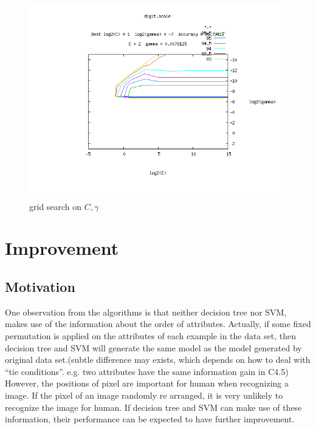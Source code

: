 \documentclass[a4paper,11pt]{article}
\begin{document}
\begin{figure}
\centering
\includegraphics[width=1.0\textwidth]{digit}
\caption{grid search on $C,\gamma$}
\end{figure}

\section{Improvement}
\subsection{Motivation}
One observation from the algorithms is that neither decision tree nor SVM, makes use of the information about the order of attributes. Actually, if some fixed permutation is applied on the attributes of each example in the data set, then decision tree and SVM will generate the same model as the model generated by original data set.(subtle difference may exists, which depends on how to deal with ``tie conditions''. e.g. two attributes have the same information gain in C4.5)\\
However, the positions of pixel are important for human when recognizing a image. If the pixel of an image randomly re arranged, it is very unlikely to recognize the image for human. If decision tree and SVM can make use of these information, their performance can be expected to have further improvement.\\
\end{document}
